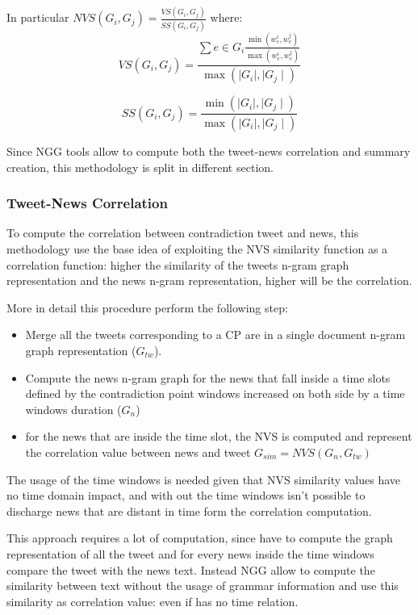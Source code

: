 In particular $NVS(G_i,G_j) = \frac{VS(G_i,G_j)}{SS(G_i,G_j)}$ where:
\begin{equation}
 VS(G_i,G_j)=\frac{\sum e \in G_i \frac{\min(w_e^i, w_e^j)}{\max(w_e^i, w_e^j)}}{\max(\mid G_i \mid, \mid G_j \mid)}
\end{equation}

\begin{equation}
 SS(G_i,G_j)=\frac{\min(\mid G_i \mid, \mid G_j \mid)}{\max(\mid G_i \mid, \mid G_j \mid)}
\end{equation}

Since NGG tools allow to compute both the tweet-news correlation and summary creation, this methodology is split in different section.

\subsubsection*{Tweet-News Correlation}
To compute the correlation between contradiction tweet and news, this methodology use the base idea of exploiting the NVS similarity function as a correlation function: higher the similarity of the tweets n-gram graph representation and the news n-gram representation, higher will be the correlation.

More in detail this procedure perform the following step:
\begin{itemize}
	\item Merge all the tweets corresponding to a CP are in a single document n-gram graph representation ($G_{tw}$).
	\item Compute the news n-gram graph for the news that fall inside a time slots defined by the contradiction point windows increased on both side by a time windows duration ($G_{n}$)
	\item for the news that are inside the time slot, the NVS is computed and represent the correlation value between news and tweet $G_{sim} = NVS(G_n, G_{tw})$
\end{itemize}

The usage of the time windows is needed given that NVS similarity values have no time domain impact, and with out the time windows isn't possible to  discharge news that are distant in time form the correlation computation.

This approach requires a lot of computation, since have to compute the graph representation of all the tweet and for every news inside the time windows compare the tweet with the news text. Instead NGG allow to compute the similarity between text without the usage of grammar information and use this similarity as correlation value: even if has no time relation.


